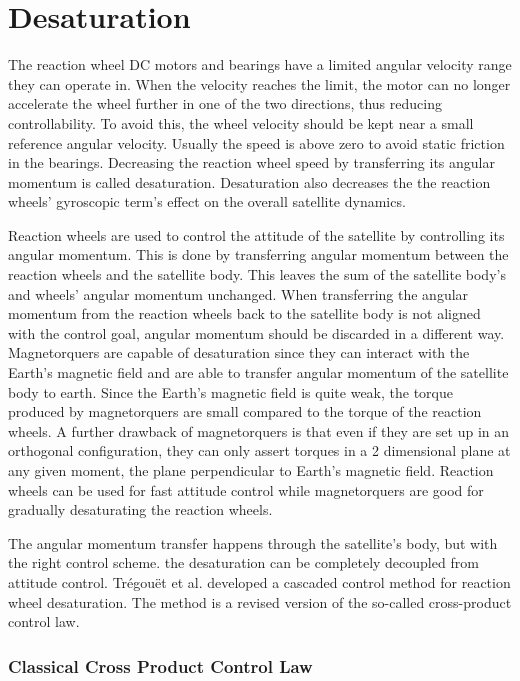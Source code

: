 \section{Desaturation}

The reaction wheel DC motors and bearings have a limited angular velocity range they can operate in. When the velocity reaches the limit, the motor can no longer accelerate the wheel further in one of the two directions, thus reducing controllability. To avoid this, the wheel velocity should be kept near a small reference angular velocity. Usually the speed is above zero to avoid static friction in the bearings. Decreasing the reaction wheel speed by transferring its angular momentum is called desaturation. Desaturation also decreases the the reaction wheels' gyroscopic term's effect on the overall satellite dynamics.

Reaction wheels are used to control the attitude of the satellite by controlling its angular momentum. This is done by transferring angular momentum between the reaction wheels and the satellite body. This leaves the sum of the satellite body's and wheels' angular momentum unchanged. When transferring the angular momentum from the reaction wheels back to the satellite body is not aligned with the control goal, angular momentum should be discarded in a different way. Magnetorquers are capable of desaturation since they can interact with the Earth's magnetic field and are able to transfer angular momentum of the satellite body to earth. Since the Earth's magnetic field is quite weak, the torque produced by magnetorquers are small compared to the torque of the reaction wheels. A further drawback of magnetorquers is that even if they are set up in an orthogonal configuration, they can only assert torques in a 2 dimensional plane at any given moment, the plane perpendicular to Earth's magnetic field. Reaction wheels can be used for fast attitude control while magnetorquers are good for gradually desaturating the reaction wheels.

The angular momentum transfer happens through the satellite's body, but with the right control scheme. the desaturation can be  completely decoupled from attitude control. Trégouët et al. \cite{DesatTregouet} developed a cascaded control method for reaction wheel desaturation. The method is a revised version of the so-called cross-product control law. 

\subsubsection{Classical Cross Product Control Law}


